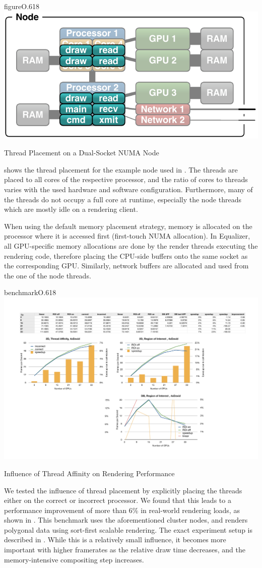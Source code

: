 \begin{wrapfloat}{figure}{O}{.618\textwidth}
 \includegraphics[width=.618\textwidth]{images/numaThreads.pdf}
 {\caption{\label{fNumaThreads}Thread Placement on a Dual-Socket NUMA Node}}
\end{wrapfloat}

 shows the thread placement for the example node used in
. The threads are placed to all cores of the respective
processor, and the ratio of cores to threads varies with the used hardware and
software configuration. Furthermore, many of the threads do not occupy a full
core at runtime, especially the node threads which are mostly idle on a
rendering client.

When using the default memory placement strategy, memory is allocated on the
processor where it is accessed first (first-touch NUMA allocation). In
Equalizer, all GPU-specific memory allocations are done by the render threads
executing the rendering code, therefore placing the CPU-side buffers onto the
same socket as the corresponding GPU. Similarly, network buffers are allocated
and used from the one of the node threads.

\begin{wrapfloat}{benchmark}{O}{.618\textwidth}
 \includegraphics[width=.618\textwidth]{results/affinity.pdf}
 {\caption{\label{rNuma}Influence of Thread Affinity on Rendering Performance}}
\end{wrapfloat}

We tested the influence of thread placement by explicitly placing the threads
either on the correct or incorrect processor. We found that this leads to a
performance improvement of more than 6\% in real-world rendering loads, as
shown in . This benchmark uses the aforementioned cluster nodes, and
renders polygonal data using sort-first scalable rendering. The exact
experiment setup is described in \cite{EBAHMP:12}. While this is a relatively
small influence, it becomes more important with higher framerates as the
relative draw time decreases, and the memory-intensive compositing step
increases.


